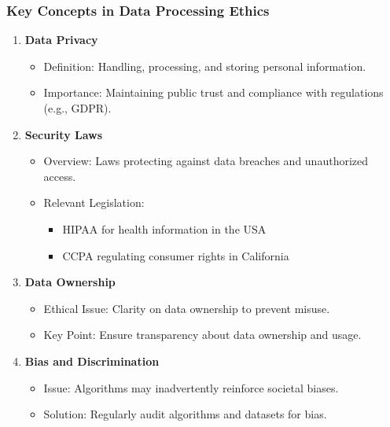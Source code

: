 \documentclass[aspectratio=169]{beamer}
\begin{document}
\begin{frame}[fragile]
    \frametitle{Key Concepts in Data Processing Ethics}
    
    \begin{enumerate}
        \item \textbf{Data Privacy}
        \begin{itemize}
            \item Definition: Handling, processing, and storing personal information.
            \item Importance: Maintaining public trust and compliance with regulations (e.g., GDPR).
        \end{itemize}

        \item \textbf{Security Laws}
        \begin{itemize}
            \item Overview: Laws protecting against data breaches and unauthorized access.
            \item Relevant Legislation: 
            \begin{itemize}
                \item HIPAA for health information in the USA
                \item CCPA regulating consumer rights in California
            \end{itemize}
        \end{itemize}
        
        \item \textbf{Data Ownership}
        \begin{itemize}
            \item Ethical Issue: Clarity on data ownership to prevent misuse.
            \item Key Point: Ensure transparency about data ownership and usage.
        \end{itemize}
        
        \item \textbf{Bias and Discrimination}
        \begin{itemize}
            \item Issue: Algorithms may inadvertently reinforce societal biases.
            \item Solution: Regularly audit algorithms and datasets for bias.
        \end{itemize}
    \end{enumerate}
\end{frame}
\end{document}

